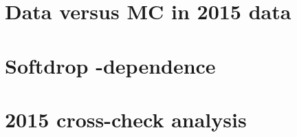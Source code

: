 \chapter{Data versus MC in 2015 data}
\label{app:datamc2015}

\chapter{Softdrop \PT-dependence}
\label{app:sdptdep}

\chapter{2015 cross-check analysis}
\label{app:2015xcheck}

